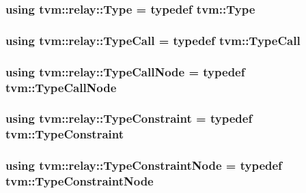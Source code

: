 \subsubsection[{\texorpdfstring{Type}{Type}}]{\setlength{\rightskip}{0pt plus 5cm}using {\bf tvm\+::relay\+::\+Type} = typedef {\bf tvm\+::\+Type}}\hypertarget{namespacetvm_1_1relay_a661d95f170bca230773914caeef3fe52}{}\label{namespacetvm_1_1relay_a661d95f170bca230773914caeef3fe52}
\subsubsection[{\texorpdfstring{Type\+Call}{TypeCall}}]{\setlength{\rightskip}{0pt plus 5cm}using {\bf tvm\+::relay\+::\+Type\+Call} = typedef {\bf tvm\+::\+Type\+Call}}\hypertarget{namespacetvm_1_1relay_ab406a37acee11226e3e2e119beee439e}{}\label{namespacetvm_1_1relay_ab406a37acee11226e3e2e119beee439e}
\subsubsection[{\texorpdfstring{Type\+Call\+Node}{TypeCallNode}}]{\setlength{\rightskip}{0pt plus 5cm}using {\bf tvm\+::relay\+::\+Type\+Call\+Node} = typedef {\bf tvm\+::\+Type\+Call\+Node}}\hypertarget{namespacetvm_1_1relay_af4dccabc877b8fd7db47cb73fb93883e}{}\label{namespacetvm_1_1relay_af4dccabc877b8fd7db47cb73fb93883e}
\subsubsection[{\texorpdfstring{Type\+Constraint}{TypeConstraint}}]{\setlength{\rightskip}{0pt plus 5cm}using {\bf tvm\+::relay\+::\+Type\+Constraint} = typedef {\bf tvm\+::\+Type\+Constraint}}\hypertarget{namespacetvm_1_1relay_a64e2e93fe04716efd8334ab4e39c92ce}{}\label{namespacetvm_1_1relay_a64e2e93fe04716efd8334ab4e39c92ce}
\subsubsection[{\texorpdfstring{Type\+Constraint\+Node}{TypeConstraintNode}}]{\setlength{\rightskip}{0pt plus 5cm}using {\bf tvm\+::relay\+::\+Type\+Constraint\+Node} = typedef {\bf tvm\+::\+Type\+Constraint\+Node}}\hypertarget{namespacetvm_1_1relay_a565e027589acded20ca38df22be098dc}{}\label{namespacetvm_1_1relay_a565e027589acded20ca38df22be098dc}
